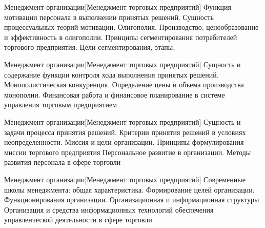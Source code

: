 \documentclass[
	11pt,
	a4paper,
	]
	{article}
\begin{document}
\vfill



\begin{minipage}[t][\miniH]{\miniL}\centering
	 {Менеджмент организации}[Менеджмент торговых предприятий]
		{
			Функция мотивации персонала в выполнении принятых решений. Сущность процессуальных теорий мотивации.
		}{
			Олигополия. Производство, ценообразование и эффективность в олигополии.
		}{
			Принципы сегментирования потребителей торгового предприятия. Цели сегментирования, этапы.
		}
	\lowGE
\end{minipage}





\begin{minipage}[t][\miniH]{\miniL}\centering
	 {Менеджмент организации}[Менеджмент торговых предприятий]
		{
			Сущность и содержание функции контроля хода выполнения принятых решений.
		}{
			Монополистическая конкуренция. Определение цены и объема производства монополии.
		}{
			Финансовая работа и финансовое планирование в системе управления торговым предприятием
		}
	\lowGE
\end{minipage}

\vfill



\begin{minipage}[t][\miniH]{\miniL}\centering
	 {Менеджмент организации}[Менеджмент торговых предприятий]
		{
			Сущность и задачи процесса принятия решений. Критерии принятия решений в условиях неопределенности.
		}{
			Миссия и цели организации. Принципы формулирования миссии торгового предприятия
		}{
			Персональное развитие в организации. Методы развития персонала в сфере торговли
		}
	\lowGE
\end{minipage}

\vfill



\begin{minipage}[t][\miniH]{\miniL}\centering
	 {Менеджмент организации}[Менеджмент торговых предприятий]
		{
			Современные школы менеджмента: общая характеристика.
		}{
			Формирование целей организации. Функционирования организации. Организационная и информационная структуры.
		}{
			Организация и средства информационных технологий обеспечения управленческой деятельности в сфере торговли
		}
	\lowGE
\end{minipage}
\end{document}
